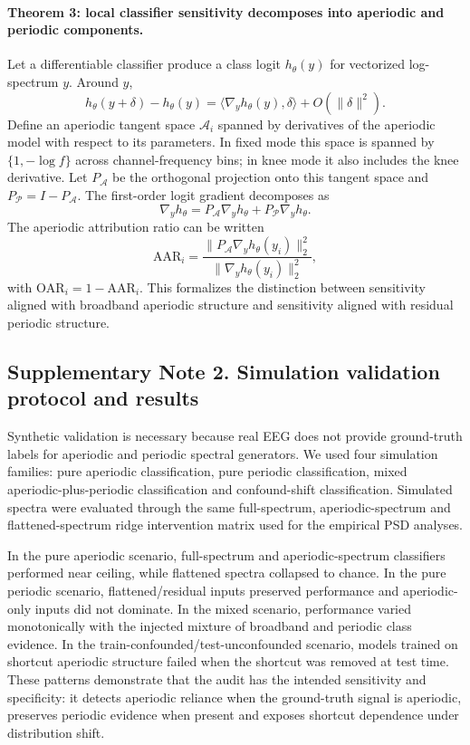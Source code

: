 \paragraph{Theorem 3: local classifier sensitivity decomposes into aperiodic and periodic components.}
Let a differentiable classifier produce a class logit $h_\theta(y)$ for vectorized log-spectrum $y$. Around $y$,
\[
h_\theta(y+\delta)-h_\theta(y)=\langle \nabla_y h_\theta(y),\delta\rangle+O(\|\delta\|^2).
\]
Define an aperiodic tangent space $\mathcal{A}_i$ spanned by derivatives of the aperiodic model with respect to its parameters. In fixed mode this space is spanned by $\{1,-\log f\}$ across channel-frequency bins; in knee mode it also includes the knee derivative. Let $P_\mathcal{A}$ be the orthogonal projection onto this tangent space and $P_\mathcal{P}=I-P_\mathcal{A}$. The first-order logit gradient decomposes as
\[
\nabla_y h_\theta = P_\mathcal{A}\nabla_y h_\theta + P_\mathcal{P}\nabla_y h_\theta.
\]
The aperiodic attribution ratio can be written
\[
\mathrm{AAR}_i=
\frac{\|P_\mathcal{A}\nabla_y h_\theta(y_i)\|_2^2}
{\|\nabla_y h_\theta(y_i)\|_2^2},
\]
with $\mathrm{OAR}_i=1-\mathrm{AAR}_i$. This formalizes the distinction between sensitivity aligned with broadband aperiodic structure and sensitivity aligned with residual periodic structure.

\subsection*{Supplementary Note 2. Simulation validation protocol and results}

Synthetic validation is necessary because real EEG does not provide ground-truth labels for aperiodic and periodic spectral generators. We used four simulation families: pure aperiodic classification, pure periodic classification, mixed aperiodic-plus-periodic classification and confound-shift classification. Simulated spectra were evaluated through the same full-spectrum, aperiodic-spectrum and flattened-spectrum ridge intervention matrix used for the empirical PSD analyses.

In the pure aperiodic scenario, full-spectrum and aperiodic-spectrum classifiers performed near ceiling, while flattened spectra collapsed to chance. In the pure periodic scenario, flattened/residual inputs preserved performance and aperiodic-only inputs did not dominate. In the mixed scenario, performance varied monotonically with the injected mixture of broadband and periodic class evidence. In the train-confounded/test-unconfounded scenario, models trained on shortcut aperiodic structure failed when the shortcut was removed at test time. These patterns demonstrate that the audit has the intended sensitivity and specificity: it detects aperiodic reliance when the ground-truth signal is aperiodic, preserves periodic evidence when present and exposes shortcut dependence under distribution shift.

